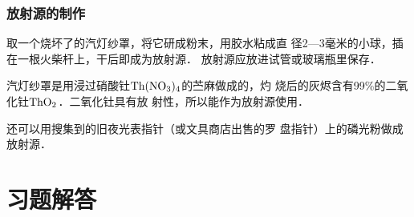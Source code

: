 \subsubsection{放射源的制作}

取一个烧坏了的汽灯纱罩，将它研成粉末，用胶水粘成直
径2—3毫米的小球，插在一根火柴杆上，干后即成为放射源．
放射源应放进试管或玻璃瓶里保存．

汽灯纱罩是用浸过硝酸钍$\rm Th(NO_3)_4$的苎麻做成的，灼
烧后的灰烬含有99\%的二氧化钍$\rm ThO_2$．二氧化钍具有放
射性，所以能作为放射源使用．

还可以用搜集到的旧夜光表指针（或文具商店出售的罗
盘指针）上的磷光粉做成放射源．


\section{习题解答}


